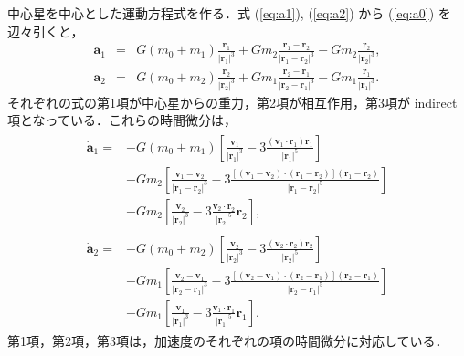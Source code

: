 \documentclass[11pt,a4paper,oneside,onecolumn]{jreport}
\begin{document}
中心星を中心とした運動方程式を作る．式 (\ref{eq:a1}), (\ref{eq:a2}) から (\ref{eq:a0}) を辺々引くと，
\begin{eqnarray}
{\bm a}_1 & = & G (m_0 + m_1) \frac{{\bm r}_1}{|{\bm r}_1|^3} + G m_2 \frac{{\bm r}_1 - {\bm r}_2}{|{\bm r}_1 - {\bm r}_2|^3} - G m_2 \frac{{\bm r}_2}{|{\bm r}_2|^3}, \\
{\bm a}_2 & = & G (m_0 + m_2) \frac{{\bm r}_2}{|{\bm r}_2|^3} + G m_1 \frac{{\bm r}_2 - {\bm r}_1}{|{\bm r}_2 - {\bm r}_1|^3} - G m_1 \frac{{\bm r}_1}{|{\bm r}_1|^3}. 
\end{eqnarray}
それぞれの式の第1項が中心星からの重力，第2項が相互作用，第3項が indirect 項となっている．これらの時間微分は，
\begin{eqnarray}
\begin{split}
\dot{{\bm a}}_1 = & - G (m_0 + m_1) \left[ \frac{{\bm v}_1}{|{\bm r}_1|^3} - 3 \frac{({\bm v}_1 \cdot {\bm r}_1) {\bm r}_1}{|{\bm r}_1|^5} \right] \\
& - G m_2 \left[ \frac{{\bm v}_1 - {\bm v}_2}{|{\bm r}_1 - {\bm r}_2|^3} - 3 \frac{[({\bm v}_1 - {\bm v}_2) \cdot ({\bm r}_1 - {\bm r}_2)] ({\bm r}_1 - {\bm r}_2)}{|{\bm r}_1 - {\bm r}_2|^5} \right] \\
& - G m_2 \left[ \frac{{\bm v}_2}{|{\bm r}_2|^3} - 3 \frac{{\bm v}_2 \cdot {\bm r}_2}{|{\bm r}_2|^5} {\bm r}_2 \right], 
\end{split}
\\
\begin{split}
\dot{{\bm a}}_2 = & - G (m_0 + m_2) \left[ \frac{{\bm v}_2}{|{\bm r}_2|^3} - 3 \frac{({\bm v}_2 \cdot {\bm r}_2) {\bm r}_2}{|{\bm r}_2|^5} \right] \\
& - G m_1 \left[ \frac{{\bm v}_2 - {\bm v}_1}{|{\bm r}_2 - {\bm r}_1|^3} - 3 \frac{[({\bm v}_2 - {\bm v}_1) \cdot ({\bm r}_2 - {\bm r}_1)] ({\bm r}_2 - {\bm r}_1)}{|{\bm r}_2 - {\bm r}_1|^5} \right] \\
& - G m_1 \left[ \frac{{\bm v}_1}{|{\bm r}_1|^3} - 3 \frac{{\bm v}_1 \cdot {\bm r}_1}{|{\bm r}_1|^5} {\bm r}_1 \right].
\end{split}
\end{eqnarray}
第1項，第2項，第3項は，加速度のそれぞれの項の時間微分に対応している．
\end{document}
